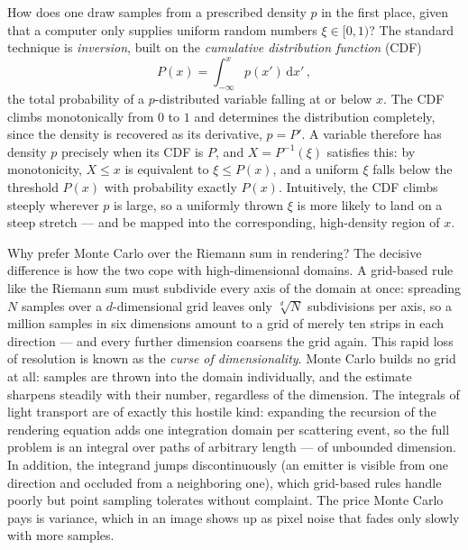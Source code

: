 How does one draw samples from a prescribed density $p$ in the first place, given that a computer only supplies uniform random numbers $\xi \in [0, 1)$? The standard technique is \emph{inversion}, built on the \emph{cumulative distribution function} (CDF)
\begin{equation*}
	P(x) = \int_{-\infty}^{x} p(x') \,\mathrm{d}x' \,,
\end{equation*}
the total probability of a $p$-distributed variable falling at or below $x$. The CDF climbs monotonically from $0$ to $1$ and determines the distribution completely, since the density is recovered as its derivative, $p = P'$. A variable therefore has density $p$ precisely when its CDF is $P$, and $X = P^{-1}(\xi)$ satisfies this: by monotonicity, $X \leq x$ is equivalent to $\xi \leq P(x)$, and a uniform $\xi$ falls below the threshold $P(x)$ with probability exactly $P(x)$. Intuitively, the CDF climbs steeply wherever $p$ is large, so a uniformly thrown $\xi$ is more likely to land on a steep stretch --- and be mapped into the corresponding, high-density region of $x$.

Why prefer Monte Carlo over the Riemann sum in rendering? The decisive difference is how the two cope with high-dimensional domains. A grid-based rule like the Riemann sum must subdivide every axis of the domain at once: spreading $N$ samples over a $d$-dimensional grid leaves only $\sqrt[d]{N}$ subdivisions per axis, so a million samples in six dimensions amount to a grid of merely ten strips in each direction --- and every further dimension coarsens the grid again. This rapid loss of resolution is known as the \emph{curse of dimensionality}. Monte Carlo builds no grid at all: samples are thrown into the domain individually, and the estimate sharpens steadily with their number, regardless of the dimension. The integrals of light transport are of exactly this hostile kind: expanding the recursion of the rendering equation adds one integration domain per scattering event, so the full problem is an integral over paths of arbitrary length --- of unbounded dimension. In addition, the integrand jumps discontinuously (an emitter is visible from one direction and occluded from a neighboring one), which grid-based rules handle poorly but point sampling tolerates without complaint. The price Monte Carlo pays is variance, which in an image shows up as pixel noise that fades only slowly with more samples.

